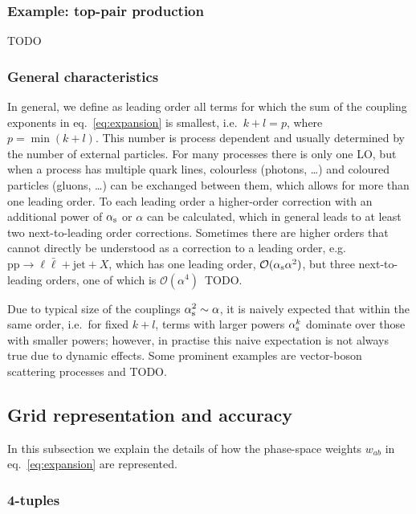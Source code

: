 
\subsubsection{Example: top-pair production}

TODO

\subsubsection{General characteristics}

In general, we define as leading order all terms for which the sum of the coupling exponents in eq.~\eqref{eq:expansion} is smallest, i.e.\ $k + l = p$, where $p = \min (k+l)$.
This number is process dependent and usually determined by the number of external particles.
For many processes there is only one LO, but when a process has multiple quark lines, colourless (photons, \dots) and coloured particles (gluons, \ldots) can be exchanged between them, which allows for more than one leading order.
To each leading order a higher-order correction with an additional power of $\alpha_\mathrm{s}$ or $\alpha$ can be calculated, which in general leads to at least two next-to-leading order corrections.
Sometimes there are higher orders that cannot directly be understood as a correction to a leading order, e.g.\ $\mathrm{p} \mathrm{p} \to \ell \bar{\ell} + \mathrm{jet} + X$, which has one leading order, $\mathcal{O} (\alpha_\mathrm{s} \alpha^2)$, but three next-to-leading orders, one of which is $\mathcal{O} (\alpha^4)$~TODO.

Due to typical size of the couplings $\alpha_\mathrm{s}^2 \sim \alpha$, it is naively expected that within the same order, i.e.\ for fixed $k + l$, terms with larger powers $\alpha_\mathrm{s}^k$ dominate over those with smaller powers; however, in practise this naive expectation is not always true due to dynamic effects.
Some prominent examples are vector-boson scattering processes and TODO.

\subsection{Grid representation and accuracy}
\label{sec:grid-representation}

In this subsection we explain the details of how the phase-space weights $w_{ab}$ in eq.~\ref{eq:expansion} are represented.

\subsubsection{4-tuples}

